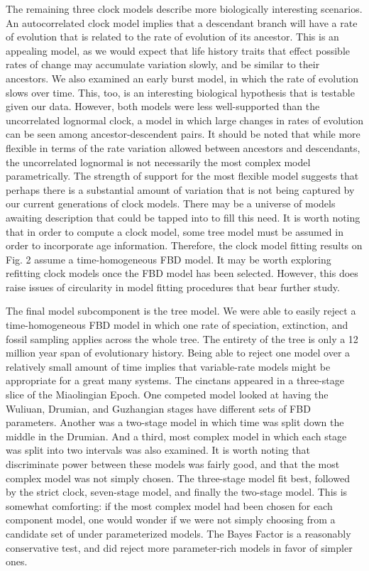 \documentclass{article}
\begin{document}
The remaining three clock models describe more biologically interesting scenarios.
An autocorrelated clock model implies that a descendant branch will have a rate of evolution that is related to the rate of evolution of its ancestor.
This is an appealing model, as we would expect that life history traits that effect possible rates of change may accumulate variation slowly, and be similar to their ancestors. 
We also examined an early burst model, in which the rate of evolution slows over time.
This, too, is an interesting biological hypothesis that is testable given our data.
However, both models were less well-supported than the uncorrelated lognormal clock,
a model in which large changes in rates of evolution can be seen among ancestor-descendent pairs.
It should be noted that while more flexible in terms of the rate variation allowed between ancestors and descendants, the uncorrelated lognormal is not necessarily the most complex model parametrically. 
The strength of support for the most flexible model suggests that perhaps there is a substantial amount of variation that is not being captured by our current generations of clock models.
There may be a universe of models awaiting description that could be tapped into to fill this need.
It is worth noting that in order to compute a clock model, some tree model must be assumed in order to incorporate age information. 
Therefore, the clock model fitting results on Fig. 2 assume a time-homogeneous FBD model. 
It may be worth exploring refitting clock models once the FBD model has been selected.
However, this does raise issues of circularity in model fitting procedures that bear further study.

The final model subcomponent is the tree model.
We were able to easily reject a time-homogeneous FBD model in which one rate of speciation, extinction, and fossil sampling applies across the whole tree.
The entirety of the tree is only a 12 million year span of evolutionary history.
Being able to reject one model over a relatively small amount of time implies that variable-rate models might be appropriate for a great many systems.
The cinctans appeared in a three-stage slice of the Miaolingian Epoch. 
One competed model looked at having the Wuliuan, Drumian, and Guzhangian stages have different sets of FBD parameters. 
Another was  a two-stage model in which time was split down the middle in the Drumian.
And a third, most complex model in which each stage was split into two intervals was also examined. 
It is worth noting that discriminate power between these models was fairly good, and that the most complex model was not simply chosen.
The three-stage model fit best, followed by the strict clock, seven-stage model, and finally the two-stage model. 
This is somewhat comforting: if the most complex model had been chosen for each component model, one would wonder if we were not simply choosing from a candidate set of under parameterized models. 
The Bayes Factor is a reasonably conservative test, and did reject more parameter-rich models in favor of simpler ones.
\end{document}
